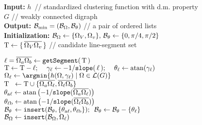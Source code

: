 
\renewcommand{\thealgocf}{}
\begin{algorithm}[H]
  \small
{}
{\bf Input:} $h$\,
// standardized clustering function with d.m. property
\\
 $G$
//  weakly connected digraph
\\
{\bf Output:}  ${\cal B}_{\min} = ({\cal B}_{\Omega}, {\cal B}_{\theta})$  
// a pair of ordered lists
\\
{\bf Initialization:}
${\cal B}_{\Omega} \gets \{\Omega_V, \Omega_v\}, \, 
{\cal B}_{\theta} \gets \{0, \pi/4, \pi/2\}$
\\[0.1em]
$\mbox{\rm T}  \gets \{\,\overline{\Omega_V \Omega_v}\, \}$
// candidate line-segment set

 {
  $ \ell = \overline{ \Omega_{a}\Omega_{b} }   \gets
  {\tt getSegment}(\, \mbox{\rm T} \,) $
  \\ 
  $\mbox{\rm T} \gets \mbox{\rm T} - \ell; \,\quad
  \gamma_{\ell} \gets -1/{\tt slope}(\,\ell\,); \,\quad
  \theta_{\ell} \gets {\rm atan}(\gamma_{\ell})$
  \\
  $ \Omega_{\ell} \gets
  \argmin\{ h(\Omega,\gamma_{\ell}) \mid \Omega \in \mathcal{L}(G) \} $ 
  \\
  {
    $\mbox{\rm T}_{\phantom{\theta}}\, \gets
    \mbox{\rm T} \cup
    \{ \overline{\Omega_{a}\Omega_{\ell}},  \overline{\Omega_{\ell}\Omega_{b}} \}$
    \\
    $\theta_{\rm a{\ell}} \gets 
      {\rm atan}
      \left( 
        -1 / {\tt slope}( \overline{\Omega_a \Omega_{\ell}} ) 
      \right)$ 
    \\
    $\theta_{\rm {\ell}b} \gets 
      {\rm atan}
      \left( 
        -1 / {\tt slope}( \overline{\Omega_{\ell} \Omega_b} )
      \right)$
    \\
    $ {\cal B}_{\theta}\, \gets {\tt insert}(
      {\cal B}_{\theta},
      \{ \theta_{\rm a{\ell}}, \theta_{\rm {\ell}b} \}
     ); \,\,\,
     {\cal B}_{\theta} \gets {\cal B}_{\theta}- \{\theta_{\rm \ell}\}$
    \\
    ${\cal B}_{\Omega} \gets {\tt insert}( {\cal B}_{\Omega}, \Omega_{\ell} )$
  } %
} %
%
\end{algorithm}
